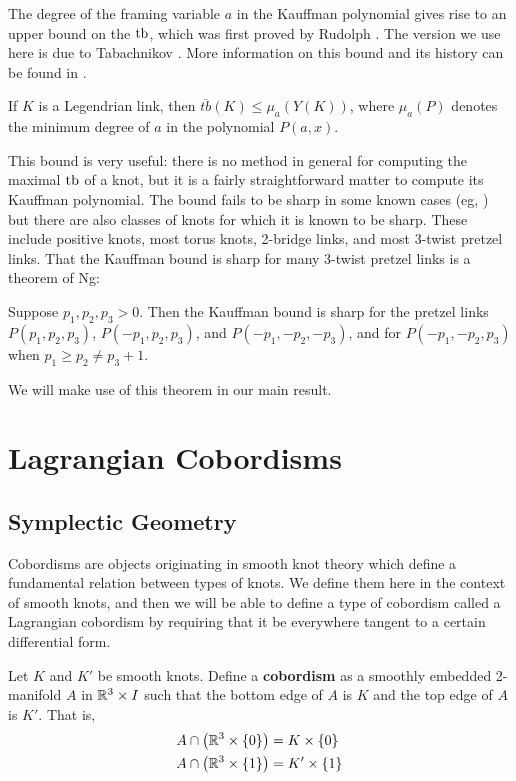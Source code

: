 The degree of the framing variable $a$ in the Kauffman polynomial gives rise to an upper bound on the $\operatorname{tb}$, which was first proved by Rudolph \cite{rudolph}. The version we use here is due to Tabachnikov \cite{tabachnikov}. More information on this bound and its history can be found in \cite{ferrand}.

\begin{theorem}\label{kauffman-bound}
    If $K$ is a Legendrian link, then $\overline{tb}(K) \leq \mu_a(Y(K))$, where $\mu_a(P)$ denotes the minimum degree of $a$ in the polynomial $P(a, x)$.
\end{theorem}

This bound is very useful: there is no method in general for computing the maximal $\operatorname{tb}$ of a knot, but it is a fairly straightforward matter to compute its Kauffman polynomial. The bound fails to be sharp in some known cases (eg, \cite{ferrand}) but there are also classes of knots for which it is known to be sharp. These include positive knots, most torus knots, 2-bridge links, and most 3-twist pretzel links. That the Kauffman bound is sharp for many 3-twist pretzel links is a theorem of Ng:

\begin{theorem}[\cite{ng}]
    Suppose $p_1, p_2, p_3 > 0$. Then the Kauffman bound is sharp for the pretzel links $P(p_1, p_2, p_3)$, $P(-p_1, p_2, p_3)$, and $P(-p_1, -p_2, -p_3)$, and for $P(-p_1, -p_2, p_3)$ when $p_1 \geq p_2 \neq p_3 + 1$.
\end{theorem}

We will make use of this theorem in our main result.

\section{Lagrangian Cobordisms}

\subsection{Symplectic Geometry}

Cobordisms are objects originating in smooth knot theory which define a fundamental relation between types of knots. We define them here in the context of smooth knots, and then we will be able to define a type of cobordism called a Lagrangian cobordism by requiring that it be everywhere tangent to a certain differential form.

\begin{definition}
    Let $K$ and $K'$ be smooth knots. Define a \textbf{cobordism} as a smoothly embedded 2-manifold $A$ in $\mathbb{R}^3 \times I$ such that the bottom edge of $A$ is $K$ and the top edge of $A$ is $K'$. That is,
    \begin{align*}
        A \cap \left(\mathbb{R}^3 \times \{0\}\right) &= K \times \{0\}\\
        A \cap \left(\mathbb{R}^3 \times \{1\}\right) &= K' \times \{1\}
    \end{align*}
\end{definition}

